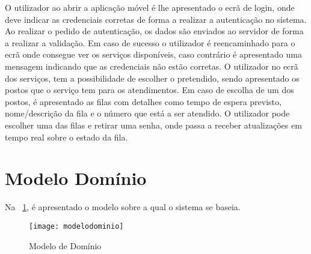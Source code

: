 O utilizador ao abrir a aplicação móvel é lhe apresentado o ecrã de login, onde deve indicar as credenciais corretas de forma a realizar a autenticação no sistema. Ao realizar o pedido de autenticação, os dados são enviados ao servidor de forma a realizar a validação. Em caso de sucesso o utilizador é reencaminhado para o ecrã onde consegue ver os serviços disponíveis, caso contrário é apresentado uma mensagem indicando que as credenciais não estão corretas. O utilizador no ecrã dos serviços, tem a possibilidade de escolher o pretendido, sendo apresentado os postos que o serviço tem para os atendimentos. Em caso de escolha de um dos postos, é apresentado as filas com detalhes como tempo de espera previsto, nome/descrição da fila e o número que está a ser atendido. O utilizador pode escolher uma das filas e retirar uma senha, onde passa a receber atualizações em tempo real sobre o estado da fila.

\section{Modelo Domínio}

Na \figurename~\ref{fig:modelodominio}, é apresentado o modelo sobre a qual o sistema se baseia.

\begin{figure}[H]
	\centering
	\texttt{[image: modelodominio]}
	  \caption{Modelo de Domínio}
  \label{fig:modelodominio}
\end{figure}

